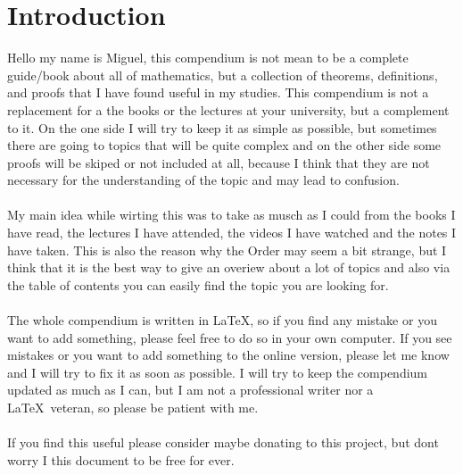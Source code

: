 \section{Introduction}

Hello my name is Miguel, this compendium is not mean to be a complete guide/book about all of mathematics,
but a collection of theorems, definitions, and proofs that I have found useful in my studies.
This compendium is not a replacement for a the books or the lectures at your university, but a complement to it.
On the one side I will try to keep it as simple as possible, but sometimes there are going to topics that will be quite 
complex and on the other side some proofs will be 
skiped or not included at all, because I think that they 
are not necessary for the understanding of the topic and may lead to confusion.
\\\\
My main idea while wirting this was to take as musch as I could from the books I have read, the lectures 
I have attended, the videos I have watched 
and the notes I have taken. This is also the reason why the Order may seem a bit strange, 
but I think that it is the best way to give an overiew about a lot of topics and also via the table of contents you can
easily find the topic you are looking for.
\\\\
The whole compendium is written in \LaTeX, so if you find any mistake or you want to add something, please 
feel free to do so in your own computer. If you see mistakes or you want to add something to the online version, please
let me know and I will try to fix it as soon as possible.
I will try to keep the compendium updated as much as 
I can, but I am not a professional writer nor a \LaTeX\ veteran, so please be patient with me.
\\\\
If you find this useful please consider maybe donating
to this project, but dont worry I this document to be free for ever.


\newpage